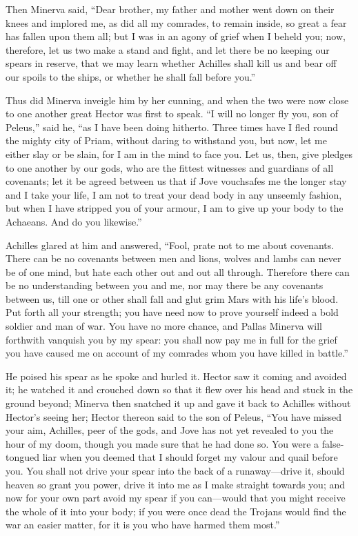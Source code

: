 Then Minerva said, “Dear brother, my father and mother went down on their
knees and implored me, as did all my comrades, to remain inside, so great
a fear has fallen upon them all; but I was in an agony of grief when I
beheld you; now, therefore, let us two make a stand and fight, and let
there be no keeping our spears in reserve, that we may learn whether
Achilles shall kill us and bear off our spoils to the ships, or whether he
shall fall before you.”

Thus did Minerva inveigle him by her cunning, and when the two were now
close to one another great Hector was first to speak. “I will no longer
fly you, son of Peleus,” said he, “as I have been doing hitherto. Three
times have I fled round the mighty city of Priam, without daring to
withstand you, but now, let me either slay or be slain, for I am in the
mind to face you. Let us, then, give pledges to one another by our gods,
who are the fittest witnesses and guardians of all covenants; let it be
agreed between us that if Jove vouchsafes me the longer stay and I take
your life, I am not to treat your dead body in any unseemly fashion, but
when I have stripped you of your armour, I am to give up your body to the
Achaeans. And do you likewise.”

Achilles glared at him and answered, “Fool, prate not to me about
covenants. There can be no covenants between men and lions, wolves and
lambs can never be of one mind, but hate each other out and out all
through. Therefore there can be no understanding between you and me, nor
may there be any covenants between us, till one or other shall fall and
glut grim Mars with his life’s blood. Put forth all your strength; you
have need now to prove yourself indeed a bold soldier and man of war. You
have no more chance, and Pallas Minerva will forthwith vanquish you by my
spear: you shall now pay me in full for the grief you have caused me on
account of my comrades whom you have killed in battle.”

He poised his spear as he spoke and hurled it. Hector saw it coming and
avoided it; he watched it and crouched down so that it flew over his head
and stuck in the ground beyond; Minerva then snatched it up and gave it
back to Achilles without Hector’s seeing her; Hector thereon said to the
son of Peleus, “You have missed your aim, Achilles, peer of the gods, and
Jove has not yet revealed to you the hour of my doom, though you made sure
that he had done so. You were a false-tongued liar when you deemed that I
should forget my valour and quail before you. You shall not drive your
spear into the back of a runaway—drive it, should heaven so grant
you power, drive it into me as I make straight towards you; and now for
your own part avoid my spear if you can—would that you might receive
the whole of it into your body; if you were once dead the Trojans would
find the war an easier matter, for it is you who have harmed them most.”

